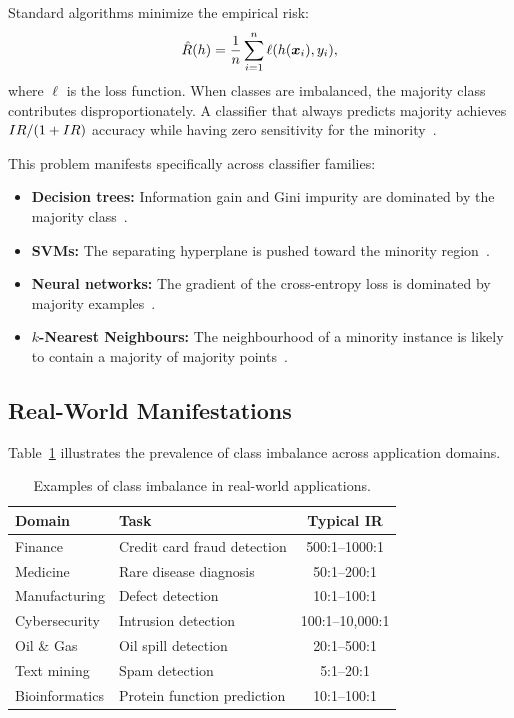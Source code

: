 Standard algorithms minimize the empirical risk:
\begin{equation}
  \hat{R}(h) = \frac{1}{n}\sum_{i=1}^n \ell(h(\bm{x}_i), y_i),
  \label{eq:empirical_risk}
\end{equation}
where $\ell$ is the loss function.
When classes are imbalanced, the majority class contributes disproportionately.
A classifier that always predicts majority achieves $IR/(1+IR)$ accuracy while having zero sensitivity for the minority~\cite{japkowicz2002class}.

This problem manifests specifically across classifier families:
\begin{itemize}[leftmargin=*]
  \item \textbf{Decision trees:} Information gain and Gini impurity are dominated by the majority class~\cite{cieslak2012hellinger}.
  \item \textbf{SVMs:} The separating hyperplane is pushed toward the minority region~\cite{akbani2004applying}.
  \item \textbf{Neural networks:} The gradient of the cross-entropy loss is dominated by majority examples~\cite{buda2018systematic}.
  \item \textbf{$k$-Nearest Neighbours:} The neighbourhood of a minority instance is likely to contain a majority of majority points~\cite{zhang2003knearest}.
\end{itemize}

\subsection{Real-World Manifestations}

Table~\ref{tab:bg:realworld} illustrates the prevalence of class imbalance across application domains.

\begin{table}[ht]
\centering
\caption{Examples of class imbalance in real-world applications.}
\label{tab:bg:realworld}
\begin{tabular}{llc}
\toprule
\textbf{Domain} & \textbf{Task} & \textbf{Typical IR} \\
\midrule
Finance & Credit card fraud detection & 500:1--1000:1 \\
Medicine & Rare disease diagnosis & 50:1--200:1 \\
Manufacturing & Defect detection & 10:1--100:1 \\
Cybersecurity & Intrusion detection & 100:1--10{,}000:1 \\
Oil \& Gas & Oil spill detection & 20:1--500:1 \\
Text mining & Spam detection & 5:1--20:1 \\
Bioinformatics & Protein function prediction & 10:1--100:1 \\
\bottomrule
\end{tabular}
\end{table}

